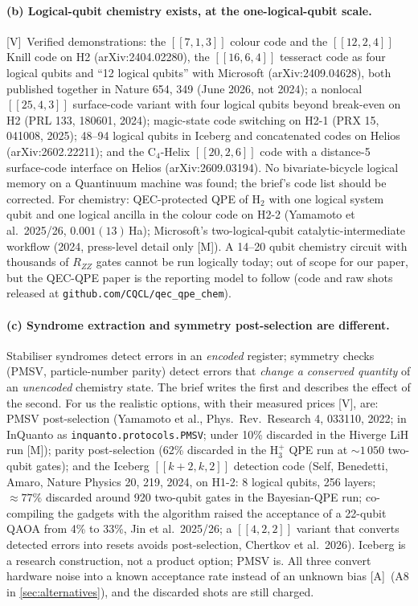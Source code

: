 \documentclass[11pt,a4paper]{article}
\newcommand{\lV}{\textcolor{keyblue}{[V]}}   %
\newcommand{\lA}{\textcolor{notegray}{[A]}}  %
\newcommand{\lM}{\textcolor{alertred}{[M]}}  %
\begin{document}
\paragraph{(b) Logical-qubit chemistry exists, at the one-logical-qubit scale.}
\lV\ Verified demonstrations: the $[[7,1,3]]$ colour code and the $[[12,2,4]]$ Knill code on H2 (arXiv:2404.02280), the $[[16,6,4]]$ tesseract code as four logical qubits and ``12 logical qubits'' with Microsoft (arXiv:2409.04628), both published together in Nature 654, 349 (June 2026, not 2024); a nonlocal $[[25,4,3]]$ surface-code variant with four logical qubits beyond break-even on H2 (PRL 133, 180601, 2024); magic-state code switching on H2-1 (PRX 15, 041008, 2025); 48--94 logical qubits in Iceberg and concatenated codes on Helios (arXiv:2602.22211); and the C$_4$-Helix $[[20,2,6]]$ code with a distance-5 surface-code interface on Helios (arXiv:2609.03194). No bivariate-bicycle logical memory on a Quantinuum machine was found; the brief's code list should be corrected. For chemistry: QEC-protected QPE of H$_2$ with one logical system qubit and one logical ancilla in the colour code on H2-2 (Yamamoto et al.\ 2025/26, $0.001(13)$\,Ha); Microsoft's two-logical-qubit catalytic-intermediate workflow (2024, press-level detail only \lM). A 14--20 qubit chemistry circuit with thousands of $R_{ZZ}$ gates cannot be run logically today; out of scope for our paper, but the QEC-QPE paper is the reporting model to follow (code and raw shots released at \texttt{github.com/CQCL/qec\_qpe\_chem}).

\paragraph{(c) Syndrome extraction and symmetry post-selection are different.}
Stabiliser syndromes detect errors in an \emph{encoded} register; symmetry checks (PMSV, particle-number parity) detect errors that \emph{change a conserved quantity} of an \emph{unencoded} chemistry state. The brief writes the first and describes the effect of the second. For us the realistic options, with their measured prices \lV, are: PMSV post-selection (Yamamoto et al., Phys.\ Rev.\ Research 4, 033110, 2022; in InQuanto as \texttt{inquanto.protocols.PMSV}; under 10\% discarded in the Hiverge LiH run \lM); parity post-selection (62\% discarded in the H$_3^+$ QPE run at $\sim1\,050$ two-qubit gates); and the Iceberg $[[k{+}2,k,2]]$ detection code (Self, Benedetti, Amaro, Nature Physics 20, 219, 2024, on H1-2: 8 logical qubits, 256 layers; $\approx77\%$ discarded around 920 two-qubit gates in the Bayesian-QPE run; co-compiling the gadgets with the algorithm raised the acceptance of a 22-qubit QAOA from 4\% to 33\%, Jin et al.\ 2025/26; a $[[4,2,2]]$ variant that converts detected errors into resets avoids post-selection, Chertkov et al.\ 2026). Iceberg is a research construction, not a product option; PMSV is. All three convert hardware noise into a known acceptance rate instead of an unknown bias \lA\ (A8 in \cref{sec:alternatives}), and the discarded shots are still charged.
\end{document}
